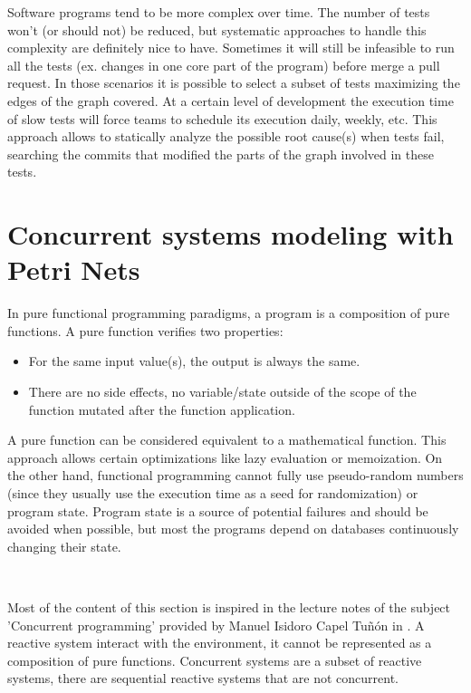 \documentclass[12pt,english]{article} %
\begin{document}
Software programs tend to be more complex over time.
The number of tests won't (or should not) be reduced, but systematic approaches to handle this complexity are definitely nice to have.
Sometimes it will still be infeasible to run all the tests (ex. changes in one core part of the program) before merge a pull request.
In those scenarios it is possible to select a subset of tests maximizing the edges of the graph covered.
At a certain level of development the execution time of slow tests will force teams to schedule its execution daily, weekly, etc.
This approach allows to statically analyze the possible root cause(s) when tests fail, searching the commits that modified the parts of the graph involved in these tests.



\newpage

\section{Concurrent systems modeling with Petri Nets}
In pure functional programming paradigms, a program is a composition of pure functions.
A pure function verifies two properties:
\begin{itemize}
    \item For the same input value(s), the output is always the same.
    \item There are no side effects, no variable/state outside of the scope of the function mutated after the function application.
\end{itemize}

A pure function can be considered equivalent to a mathematical function.
This approach allows certain optimizations like lazy evaluation or memoization.
On the other hand, functional programming cannot fully use pseudo-random numbers (since they usually use the execution time as a seed for randomization) or program state.
Program state is a source of potential failures and should be avoided when possible, but most the programs depend on databases continuously changing their state.

\ 

Most of the content of this section is inspired in the lecture notes of the subject 'Concurrent programming' provided by Manuel Isidoro Capel Tuñón in \cite{lecture-notes-concurrent-systems-validation}.
A reactive system interact with the environment, it cannot be represented as a composition of pure functions.
Concurrent systems are a subset of reactive systems, there are sequential reactive systems that are not concurrent.
\end{document}
